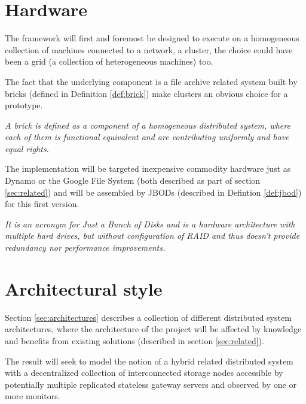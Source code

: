 \section{Hardware}
The framework will first and foremost be designed to execute on a homogeneous collection of machines connected to a network, \ie a cluster, the choice could have been a grid (a collection of heterogeneous machines) too. 

The fact that the underlying component is a file archive related system built by bricks (defined in Definition \ref{def:brick}) make clusters an obvious choice for a prototype.

\vspace*{3mm}
\begin{definition}[Brick] \label{def:brick}
\textit{A brick is defined as a component of a homogeneous distributed system, where each of them is functional equivalent and are contributing uniformly and have equal rights.}
\end{definition}
\vspace*{3mm}

The implementation will be targeted inexpensive commodity hardware just as \eg Dynamo or the Google File System (both described as part of section \ref{sec:related}) and will be assembled by JBODs (described in Defintion \ref{def:jbod}) for this first version.

\vspace*{3mm}
\begin{definition}[JBOD] \label{def:jbod}
\textit{It is an acronym for Just a Bunch of Disks and is a hardware architecture with multiple hard drives, but without configuration of RAID and thus doesn't provide redundancy nor performance improvements.}
\end{definition}


\section{Architectural style}
Section \ref{sec:architectures} describes a collection of different distributed system architectures\cite{Tanenbaum:2006:DSP:1202502}, where the architecture of the project will be affected by knowledge and benefits from existing solutions (described in section \ref{sec:related}). 
\newline

The result will seek to model the notion of a hybrid related distributed system with a decentralized collection of interconnected storage nodes accessible by potentially multiple replicated stateless gateway servers and observed by one or more monitors.

